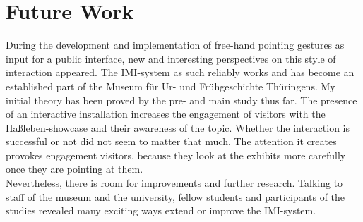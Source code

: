 \chapter{Future Work}
\label{future_work}

During the development and implementation of free-hand pointing gestures as input for a public interface, new and interesting perspectives on this style of interaction appeared. The \ac{IMI}-system as such reliably works and has become an established part of the Museum für Ur- und Frühgeschichte Thüringens. My initial theory has been proved by the pre- and main study thus far. The presence of an interactive installation increases the engagement of visitors with the Haßleben-showcase and their awareness of the topic. Whether the interaction is successful or not did not seem to matter that much. The attention it creates provokes engagement visitors, because they look at the exhibits more carefully once they are pointing at them. 
\\
Nevertheless, there is room for improvements and further research. Talking to staff of the museum and the university, fellow students and participants of the studies revealed many exciting ways extend or improve the \ac{IMI}-system. 

